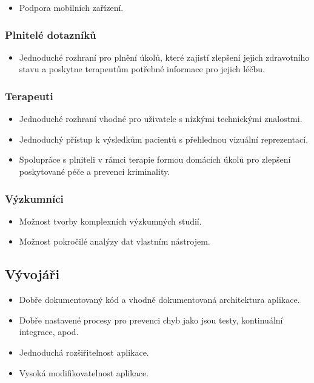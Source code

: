 \begin{itemize}
    \item
    Podpora mobilních zařízení.
\end{itemize}

\subsubsection*{Plnitelé dotazníků}\label{subsubsec:plnitele}

\begin{itemize}
    \item
    Jednoduché rozhraní pro plnění úkolů, které zajistí zlepšení jejich zdravotního stavu a poskytne terapeutům potřebné informace pro jejich léčbu.
\end{itemize}

\subsubsection*{Terapeuti}\label{subsubsec:terapeuti}

\begin{itemize}
    \item
    Jednoduché rozhraní vhodné pro uživatele s nízkými technickými znalostmi.
    \item
    Jednoduchý přístup k výsledkům pacientů s přehlednou vizuální reprezentací.
    \item
    Spolupráce s plniteli v rámci terapie formou domácích úkolů pro zlepšení poskytované péče a prevenci kriminality.
\end{itemize}

\subsubsection*{Výzkumníci}\label{subsubsec:vyzkumnici}

\begin{itemize}
    \item
    Možnost tvorby komplexních výzkumných studií.
    \item
    Možnost pokročilé analýzy dat vlastním nástrojem.
\end{itemize}

\subsection*{Vývojáři}\label{subsec:vyvojari}

\begin{itemize}
    \item
    Dobře dokumentovaný kód a vhodně dokumentovaná architektura aplikace.
    \item
    Dobře nastavené procesy pro prevenci chyb jako jsou testy, kontinuální integrace, apod.
    \item
    Jednoduchá rozšiřitelnost aplikace.
    \item
    Vysoká modifikovatelnost aplikace.
\end{itemize}

